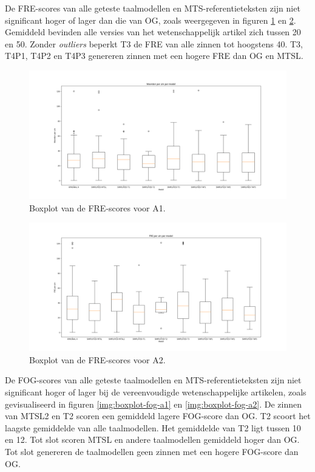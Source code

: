 De FRE-scores van alle geteste taalmodellen en MTS-referentieteksten zijn niet significant hoger of lager dan die van OG, zoals weergegeven in figuren \ref{img:boxplot-fre-a1} en \ref{img:boxplot-fre-a2}. Gemiddeld bevinden alle versies van het wetenschappelijk artikel zich tussen 20 en 50. Zonder \textit{outliers} beperkt T3 de FRE van alle zinnen tot hoogstens 40. T3, T4P1, T4P2 en T4P3 genereren zinnen met een hogere FRE dan OG en MTSL. 

\begin{figure}
	\includegraphics[width=\linewidth]{img/boxplot-fre-a1.png}
	\caption{Boxplot van de FRE-scores voor A1.}
	\label{img:boxplot-fre-a1}
\end{figure}

\begin{figure}
	\includegraphics[width=\linewidth]{img/boxplot-fre-a2.png}
	\caption{Boxplot van de FRE-scores voor A2.}
	\label{img:boxplot-fre-a2}
\end{figure}

De FOG-scores van alle geteste taalmodellen en MTS-referentieteksten zijn niet significant hoger of lager bij de vereenvoudigde wetenschappelijke artikelen, zoals gevisualiseerd in figuren \ref{img:boxplot-fog-a1} en \ref{img:boxplot-fog-a2}. De zinnen van MTSL2 en T2 scoren een gemiddeld lagere FOG-score dan OG. T2 scoort het laagste gemiddelde van alle taalmodellen. Het gemiddelde van T2 ligt tussen 10 en 12. Tot slot scoren MTSL en andere taalmodellen gemiddeld hoger dan OG. Tot slot genereren de taalmodellen geen zinnen met een hogere FOG-score dan OG.


